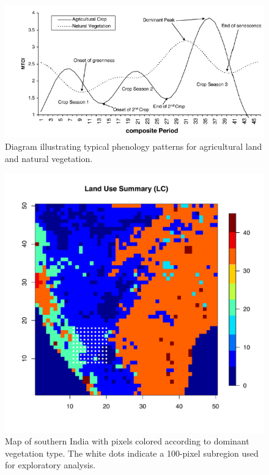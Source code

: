 \begin{figure}[htbp] %
   \centering
   \includegraphics[width=\linewidth]{Images-future-work/PhenoVars_Jegan.png} 
   \caption{Diagram illustrating typical phenology patterns for agricultural land and natural vegetation. }
   \label{fig:phenology diagram}
\end{figure}


\begin{figure}[htbp] %
   \centering
   \includegraphics[width=\linewidth]{Images-future-work/LCAndSubregion_SIX.pdf} 
   \caption{Map of southern India with pixels colored according to dominant vegetation type. The white dots indicate a 100-pixel subregion used for exploratory analysis.}
   \label{fig:land use map}
\end{figure}

